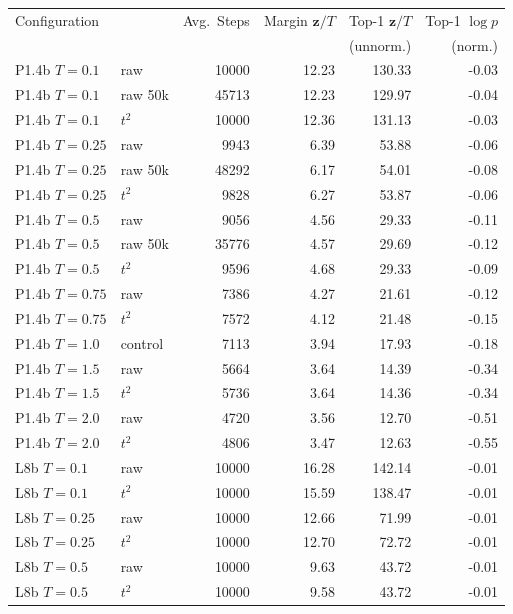 \begin{tabular}{llrrrr}
\toprule
 Configuration & & Avg.\ Steps & Margin $\mathbf{z}/T$ & Top-1 $\mathbf{z}/T$ & Top-1 $\log p$ \\
 & & & & (unnorm.) & (norm.) \\
\midrule
 P1.4b $T{=}0.1$ & raw & 10000 & 12.23 & 130.33 & -0.03 \\
 P1.4b $T{=}0.1$ & raw 50k & 45713 & 12.23 & 129.97 & -0.04 \\
 P1.4b $T{=}0.1$ & $t^2$ & 10000 & 12.36 & 131.13 & -0.03 \\
\addlinespace[2pt]
 P1.4b $T{=}0.25$ & raw & 9943 & 6.39 & 53.88 & -0.06 \\
 P1.4b $T{=}0.25$ & raw 50k & 48292 & 6.17 & 54.01 & -0.08 \\
 P1.4b $T{=}0.25$ & $t^2$ & 9828 & 6.27 & 53.87 & -0.06 \\
\addlinespace[2pt]
 P1.4b $T{=}0.5$ & raw & 9056 & 4.56 & 29.33 & -0.11 \\
 P1.4b $T{=}0.5$ & raw 50k & 35776 & 4.57 & 29.69 & -0.12 \\
 P1.4b $T{=}0.5$ & $t^2$ & 9596 & 4.68 & 29.33 & -0.09 \\
\addlinespace[2pt]
 P1.4b $T{=}0.75$ & raw & 7386 & 4.27 & 21.61 & -0.12 \\
 P1.4b $T{=}0.75$ & $t^2$ & 7572 & 4.12 & 21.48 & -0.15 \\
\addlinespace[2pt]
 P1.4b $T{=}1.0$ & control & 7113 & 3.94 & 17.93 & -0.18 \\
\addlinespace[2pt]
 P1.4b $T{=}1.5$ & raw & 5664 & 3.64 & 14.39 & -0.34 \\
 P1.4b $T{=}1.5$ & $t^2$ & 5736 & 3.64 & 14.36 & -0.34 \\
\addlinespace[2pt]
 P1.4b $T{=}2.0$ & raw & 4720 & 3.56 & 12.70 & -0.51 \\
 P1.4b $T{=}2.0$ & $t^2$ & 4806 & 3.47 & 12.63 & -0.55 \\
\midrule
 L8b $T{=}0.1$ & raw & 10000 & 16.28 & 142.14 & -0.01 \\
 L8b $T{=}0.1$ & $t^2$ & 10000 & 15.59 & 138.47 & -0.01 \\
\addlinespace[2pt]
 L8b $T{=}0.25$ & raw & 10000 & 12.66 & 71.99 & -0.01 \\
 L8b $T{=}0.25$ & $t^2$ & 10000 & 12.70 & 72.72 & -0.01 \\
\addlinespace[2pt]
 L8b $T{=}0.5$ & raw & 10000 & 9.63 & 43.72 & -0.01 \\
 L8b $T{=}0.5$ & $t^2$ & 10000 & 9.58 & 43.72 & -0.01 \\

\end{tabular}
